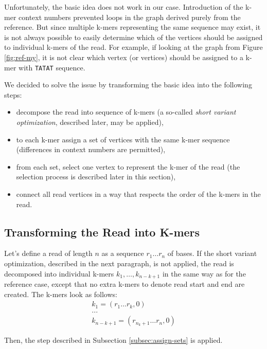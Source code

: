 Unfortunately, the basic idea does not work in our case. Introduction of the k-mer context numbers prevented loops in the graph derived purely from the reference. But since multiple k-mers representing the same sequence may exist, it is not always possible to easily determine which of the vertices should be assigned to individual k-mers of the read. For example, if looking at the graph from Figure \ref{fig:ref-my}, it is not clear which vertex (or vertices) should be assigned to a k-mer with \texttt{TATAT} sequence. 

We decided to solve the issue by transforming the basic idea into the following steps:
\begin{itemize}
\item decompose the read into sequence of k-mers (a so-called \textit{short variant optimization}, described later, may be applied),
\item to each k-mer assign a set of vertices with the same k-mer sequence (differences in context numbers are permitted),
\item from each set, select one vertex to represent the k-mer of the read (the selection process is described later in this section),
\item connect all read vertices in a way that respects the order of the k-mers in the read.
\end{itemize}

\subsection{Transforming the Read into K-mers}
\label{subsec:transforming-the-read-info-k-mers}

Let's define a read of length $n$ as a sequence $r_1 \ldots r_n$ of bases. If the short variant optimization, described in the next paragraph, is not applied, the read is decomposed into individual k-mers $k_1, \ldots , k_{n-k+1}$ in the same way as for the reference case, except that no extra k-mers to denote read start and end are created. The k-mers look as follows:
\begin{align*}
k_1 = (r_1 \ldots r_k, 0) \\
... \\
k_{n-k+1} = (r_{n_k+1} \ldots r_n, 0)
\end{align*}

Then, the step described in Subsection \ref{subsec:assign-sets} is applied.

